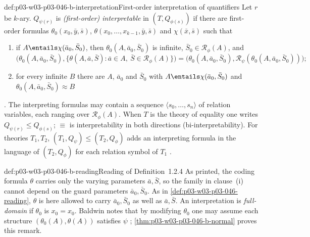 \begin{hbdefinition}{def:p03-w03-p03-046-b-interpretation}{First-order interpretation of quantifiers}
Let \(r\) be \(k\)-ary. \(Q_{\psi(r)}\) is \emph{(first-order)
interpretable} in \((T,Q_{\phi(s)})\) if there are first-order formulas
\(\theta_0(x_0,\bar y,\bar s)\), \(\theta(x_0,\dots,x_{k-1},\bar y,\bar s)\)
and \(\chi(\bar x,\bar s)\) such that
\begin{enumerate}
  \item[(i)] if \(A\entails\chi(\bar a_0,\bar S_0)\), then
        \(\theta_0(A,\bar a_0,\bar S_0)\) is infinite,
        \(\bar S_0\in\mathscr R_\phi(A)\), and
        \[
        \bigl(\theta_0(A,\bar a_0,\bar S_0),\{\theta(A,\bar a,\bar S):\bar
        a\in A,\ \bar S\in\mathscr R_\phi(A)\}\bigr)
        =\bigl(\theta_0(A,\bar a_0,\bar S_0),\mathscr R_\psi(\theta_0(A,\bar
        a_0,\bar S_0))\bigr);
        \]
  \item[(ii)] for every infinite \(B\) there are \(A\), \(\bar a_0\) and
        \(\bar S_0\) with \(A\entails\chi(\bar a_0,\bar S_0)\) and
        \(\theta_0(A,\bar a_0,\bar S_0)\approx B\)
\end{enumerate}
\cite[p.~448, Definition~1.2.4]{Baldwin1985DSOQ}. The interpreting formulas
may contain a sequence \(\langle s_0,\dots,s_n\rangle\) of relation
variables, each ranging over \(\mathscr R_\phi(A)\). When \(T\) is the
theory of equality one writes \(Q_{\psi(r)}\le Q_{\phi(s)}\);
\(\equiv\) is interpretability in both directions (bi-interpretability).
For theories \(T_1,T_2\), \((T_1,Q_\psi)\le(T_2,Q_\phi)\) adds an
interpreting formula in the language of \((T_2,Q_\phi)\) for each relation
symbol of \(T_1\) \cite[p.~448]{Baldwin1985DSOQ}.
\end{hbdefinition}

\begin{hbconvention}{def:p03-w03-p03-046-b-reading}{Reading of Definition~1.2.4}
As printed, the coding formula \(\theta\) carries only the varying
parameters \(\bar a,\bar S\), so the family in clause~(i) cannot depend on
the guard parameters \(\bar a_0,\bar S_0\). As in
\cref{def:p03-w03-p03-046-reading}, \(\theta\) is here allowed to carry
\(\bar a_0,\bar S_0\) as well as \(\bar a,\bar S\). An interpretation is
\emph{full-domain} if \(\theta_0\) is \(x_0=x_0\). Baldwin notes that by
modifying \(\theta_0\) one may assume each structure
\((\theta_0(A),\theta(A))\) satisfies \(\psi\)
\cite[p.~448]{Baldwin1985DSOQ}; \cref{thm:p03-w03-p03-046-b-normal} proves
this remark.
\end{hbconvention}

